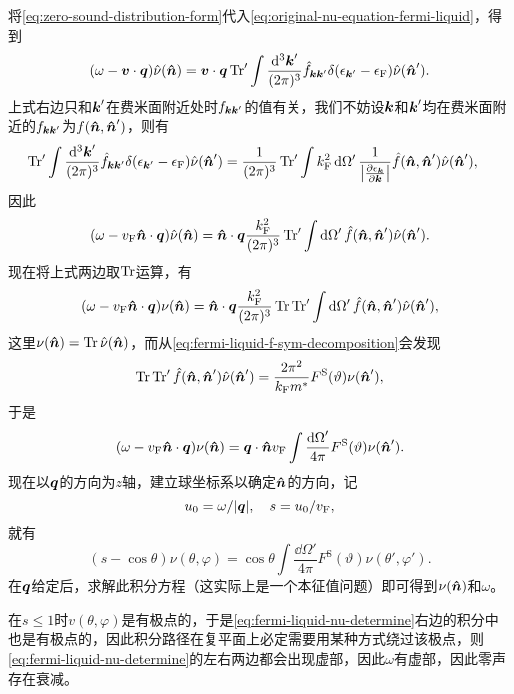 将\eqref{eq:zero-sound-distribution-form}代入\eqref{eq:original-nu-equation-fermi-liquid}，得到
\[
    (\omega - \vb*{v} \cdot \vb*{q}) \hat{\nu}(\vu*{n}) = \vb*{v} \cdot \vb*{q} \Trace' \int \frac{\dd[3]{\vb*{k}'}}{(2\pi)^3} \hat{f}_{\vb*{k} \vb*{k}'} \delta(\epsilon_{\vb*{k}'} - \epsilon_\text{F}) \hat{\nu}(\vu*{n}').
\]
上式右边只和$\vb*{k}'$在费米面附近处时$f_{\vb*{k} \vb*{k}'}$的值有关，我们不妨设$\vb*{k}$和$\vb*{k}'$均在费米面附近的$f_{\vb*{k} \vb*{k}'}$为$f(\vu*{n}, \vu*{n}')$，则有
\[
    \begin{aligned}
        \Trace' \int \frac{\dd[3]{\vb*{k}'}}{(2\pi)^3} \hat{f}_{\vb*{k} \vb*{k}'} \delta(\epsilon_{\vb*{k}'} - \epsilon_\text{F}) \hat{\nu}(\vu*{n}') &= \frac{1}{(2\pi)^3} \Trace' \int k_\text{F}^2 \dd{\Omega'} \frac{1}{\abs{\pdv{\epsilon_{\vb*{k}}}{\vb*{k}}}} \hat{f}(\vu*{n}, \vu*{n}') \hat{\nu}(\vu*{n}'),
    \end{aligned}
\]
因此
\[
    (\omega - v_\text{F} \vu*{n} \cdot \vb*{q}) \hat{\nu}(\vu*{n}) = \vu*{n} \cdot \vb*{q} \frac{k_\text{F}^2}{(2\pi)^3} \Trace' \int \dd{\Omega'} \hat{f}(\vu*{n}, \vu*{n}') \hat{\nu}(\vu*{n}').
\]
现在将上式两边取$\Trace$运算，有
\[
    (\omega - v_\text{F} \vu*{n} \cdot \vb*{q}) {\nu}(\vu*{n}) = \vu*{n} \cdot \vb*{q} \frac{k_\text{F}^2}{(2\pi)^3} \Trace \Trace' \int \dd{\Omega'} \hat{f}(\vu*{n}, \vu*{n}') \hat{\nu}(\vu*{n}'),
\]
这里$\nu(\vu*{n}) = \Trace \hat{\nu}(\vu*{n})$，而从\eqref{eq:fermi-liquid-f-sym-decomposition}会发现
\[
    \Trace \Trace' \hat{f}(\vu*{n}, \vu*{n}') \hat{\nu}(\vu*{n}') = \frac{2 \pi^2}{k_\text{F} m^*} F^\text{S}(\vartheta) \nu(\vu*{n}'),
\]
于是
\begin{equation}
    (\omega - v_\text{F} \vu*{n} \cdot \vb*{q}) {\nu}(\vu*{n}) = \vb*{q} \cdot \vu*{n} v_\text{F} \int \frac{\dd{\Omega}'}{4\pi} F^\text{S}(\vartheta) \nu(\vu*{n}').
\end{equation}
现在以$\vb*{q}$的方向为$z$轴，建立球坐标系以确定$\vu*{n}$的方向，记
\begin{equation}
    u_0 = \omega / \abs{\vb*{q}}, \quad s = u_0 / v_\text{F},
\end{equation}
就有
\begin{equation}
    (s - \cos \theta) \nu(\theta, \varphi) = \cos \theta \int \frac{\dd{\Omega'}}{4\pi} F^\text{S}(\vartheta) \nu(\theta', \varphi').
    \label{eq:fermi-liquid-nu-determine}
\end{equation}
在$\vb*{q}$给定后，求解此积分方程（这实际上是一个本征值问题）即可得到$\nu(\vu*{n})$和$\omega$。

在$s \leq 1$时$v(\theta, \varphi)$是有极点的，于是\eqref{eq:fermi-liquid-nu-determine}右边的积分中也是有极点的，因此积分路径在复平面上必定需要用某种方式绕过该极点，则\eqref{eq:fermi-liquid-nu-determine}的左右两边都会出现虚部，因此$\omega$有虚部，因此零声存在衰减。

